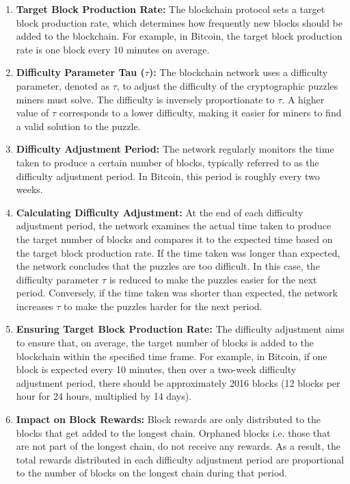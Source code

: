   \begin{enumerate}
  \item \textbf{Target Block Production Rate:} The blockchain protocol sets a target block production rate, which determines how frequently
  new blocks should be added to the blockchain. For example, in Bitcoin, the target block production rate is one block every 10 minutes
  on average.
  
  \item \textbf{Difficulty Parameter Tau ($\tau$):} The blockchain network uses a difficulty parameter, denoted as $\tau$, to adjust the 
  difficulty of the cryptographic puzzles miners must solve. The difficulty is inversely proportionate to $\tau$. A higher value of 
  $\tau$ corresponds to a lower difficulty, making it easier for miners to find a valid solution to the puzzle.
  
  \item \textbf{Difficulty Adjustment Period:} The network regularly monitors the time taken to produce a certain number of blocks, 
  typically referred to as the difficulty adjustment period. In Bitcoin, this period is roughly every two weeks.
  
  \item \textbf{Calculating Difficulty Adjustment:} At the end of each difficulty adjustment period, the network examines the actual time 
  taken to produce the target number of blocks and compares it to the expected time based on the target block production rate. If the time 
  taken was longer than expected, the network concludes that the puzzles are too difficult. In this case, the difficulty parameter $\tau$
   is reduced to make the puzzles easier for the next period. Conversely, if the time taken was shorter than expected, the network 
   increases $\tau$ to make the puzzles harder for the next period.
  
  \item \textbf{Ensuring Target Block Production Rate:} The difficulty adjustment aims to ensure that, on average, the target number of blocks is added to the blockchain within the specified time frame. For example, in Bitcoin, if one block is expected every 10 minutes, then over a two-week difficulty adjustment period, there should be approximately 2016 blocks (12 blocks per hour for 24 hours, multiplied by 14 days).
  
  \item \textbf{Impact on Block Rewards:} Block rewards are only distributed to the blocks that get added to the longest chain. Orphaned blocks i.e. those that are not part of the longest chain, do not receive any rewards. As a result, the total rewards distributed in each difficulty adjustment period are proportional to the number of blocks on the longest chain during that period.
  
  \end{enumerate}
  
